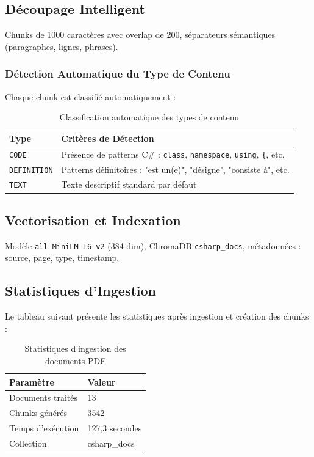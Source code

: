 \documentclass[12pt,a4paper]{report}
\begin{document}
\subsection{Découpage Intelligent}
Chunks de 1000 caractères avec overlap de 200, séparateurs sémantiques (paragraphes, lignes, phrases).

\subsubsection{Détection Automatique du Type de Contenu}
Chaque chunk est classifié automatiquement :

\begin{table}[H]
    \renewcommand{\arraystretch}{1.3}
    \begin{tabularx}{\textwidth}{|l|X|}
        \hline
        \rowcolor{green!20}
        \textbf{Type} & \textbf{Critères de Détection} \\
        \hline
        \texttt{CODE} & Présence de patterns C\# : \texttt{class}, \texttt{namespace}, \texttt{using}, \texttt{\{}, etc. \\
        \hline
        \texttt{DEFINITION} & Patterns définitoires : "est un(e)", "désigne", "consiste à", etc. \\
        \hline
        \texttt{TEXT} & Texte descriptif standard par défaut \\
        \hline
    \end{tabularx}
    \caption{Classification automatique des types de contenu}
\end{table}

\subsection{Vectorisation et Indexation}
Modèle \texttt{all-MiniLM-L6-v2} (384 dim), ChromaDB \texttt{csharp\_docs}, métadonnées : source, page, type, timestamp.

\subsection{Statistiques d'Ingestion}
Le tableau suivant présente les statistiques après ingestion et création des chunks :

\begin{table}[H]
    \renewcommand{\arraystretch}{1.3} %
    \begin{tabularx}{\textwidth}{|l|X|}
        \hline
        \rowcolor{green!20}
        \textbf{Paramètre} & \textbf{Valeur} \\
        \hline
        Documents traités & 13 \\
        Chunks générés & 3542 \\
        Temps d'exécution & 127,3 secondes \\
        Collection & csharp\_docs \\
        \hline
    \end{tabularx}
    \caption{Statistiques d’ingestion des documents PDF}
    \label{tab:stats_ingestion}
\end{table}
\end{document}

